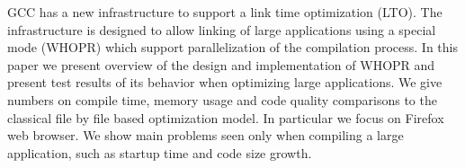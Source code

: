 GCC has a new infrastructure to support a link time optimization (LTO). The
infrastructure is designed to allow linking of large applications
using a special mode (WHOPR) which support parallelization of the compilation process.
In this paper we present overview of the design and
implementation of WHOPR and present test results of its behavior when optimizing large applications. We
give numbers on compile time, memory usage and code quality comparisons to the
classical file by file based optimization model. In particular we focus on Firefox web
browser. We show main problems seen only when compiling a large
application, such as startup time and code size growth.
